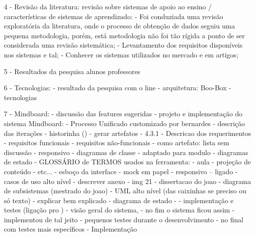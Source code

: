         4 - Revisão da literatura: revisão sobre sistemas de apoio ao ensino / características de sistemas de aprendizado:
            - Foi conduziada uma revisão exploratória da literatura, onde o processo de obtenção de dados seguiu uma pequena metodologia, porém, está metodologia não foi tão rígida a ponto de ser considerada uma revisão sistemática;
            - Levantamento dos requisitos disponíveis nos sistemas e tal;
            - Conhecer os sistemas utilizados no mercado e em artigos;
        

        5 - Resultados da pesquisa alunos professores
        
        6 - Tecnologias:
                - resultado da pesquisa com o line
                - arquitetura: Boo-Box
                - tecnologias


        7 - Mindboard:
            - discussão das features sugeridas
            - projeto e implementação do sistema Mindboard:
                - Processo Unificado customizado por bernardes
                    - descrição das iterações - historinha () - gerar artefatos
                - 4.3.1 - Descricao dos requerimentos
                - requisitos funcionais
                - requisitos não-funcionais
                    - como artefato: lista sem discussão
                    - responsivo
                - diagramas de classe
                    - adaptado para modulo
                - diagramas de estado
                - GLOSSÁRIO de TERMOS usados na ferramenta:
                    - aula
                    - projeção de conteúdo
                    - etc...
                - esboço da interface
                    - mock em papel
                    - responsivo -- ligado
                - casos de uso alto nível
                    - descrever anexo
                - img 21 - dissertacao do joao - diagrama de subsistemas (mestrado do joao)
                - UML alto nível (das caixinhas se preciso ou só texto)
                    - explicar bem explicado
                - diagrama de estado
                    - 
                - implementação e testes (ligação pro )
                    - visão geral do sistema,
                    - no fim o sistema ficou assim
                    - implementou de tal jeito
                    - pequenos testes durante o desenvolvimento
                    - no final com testes mais específicos
            - Implementação


